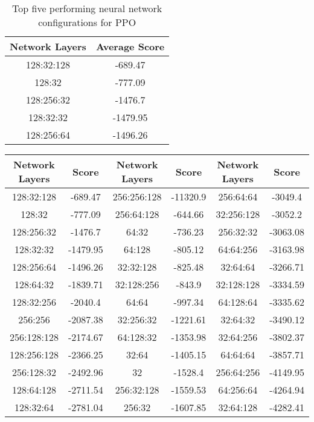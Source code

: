 \begin{table}[h]
\centering
\begin{tabular}{|c|c|}
\hline
\textbf{Network Layers} & \textbf{Average Score} \\
\hline
\hline
128:32:128 & -689.47  \\
\hline
128:32 & -777.09  \\
\hline
128:256:32 & -1476.7   \\
\hline
128:32:32 & -1479.95  \\
\hline
128:256:64 & -1496.26  \\
\hline
\end{tabular}
\caption{Top five performing neural network configurations for PPO}
\label{tab:ppo_top_nn_configurations}
\end{table}
    
\begin{table}[h]
\centering
\begin{tabular}{|c|c||c|c||c|c|}
\hline
Network Layers & Score & Network Layers & Score & Network Layers & Score \\
\hline
128:32:128 & -689.47 & 256:256:128 & -11320.9 & 256:64:64 & -3049.4 \\
\hline
128:32 & -777.09 & 256:64:128 & -644.66 & 32:256:128 & -3052.2 \\
\hline
128:256:32 & -1476.7 & 64:32 & -736.23 & 256:32:32 & -3063.08 \\
\hline
128:32:32 & -1479.95 & 64:128 & -805.12 & 64:64:256 & -3163.98 \\
\hline
128:256:64 & -1496.26 & 32:32:128 & -825.48 & 32:64:64 & -3266.71 \\
\hline
128:64:32 & -1839.71 & 32:128:256 & -843.9 & 32:128:128 & -3334.59 \\
\hline
128:32:256 & -2040.4 & 64:64 & -997.34 & 64:128:64 & -3335.62 \\
\hline
256:256 & -2087.38 & 32:256:32 & -1221.61 & 32:64:32 & -3490.12 \\ 
\hline
256:128:128 & -2174.67 & 64:128:32 & -1353.98 & 32:64:256 & -3802.37 \\
\hline
128:256:128 & -2366.25 & 32:64 & -1405.15 & 64:64:64 & -3857.71 \\
\hline
256:128:32 & -2492.96 & 32 & -1528.4 & 256:64:256 & -4149.95 \\
\hline
128:64:128 & -2711.54 & 256:32:128 & -1559.53 & 64:256:64 & -4264.94 \\
\hline
128:32:64 & -2781.04 & 256:32 & -1607.85 & 32:64:128 & -4282.41 \\

\end{tabular}
\end{table}
